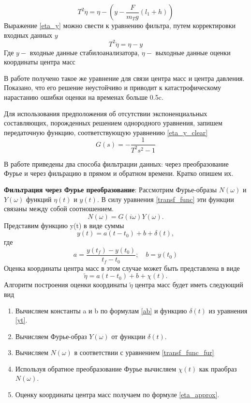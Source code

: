 \documentclass[a4paper,12pt, openany]{book}
\theoremstyle{plain} %
\theoremstyle{definition} %
\theoremstyle{remark} %
\numberwithin{equation}{chapter}
\begin{document}
{\begin{equation}\label{eta_y}
    T^2\ddot{\eta}=\eta-(y-\frac{F}{m_Tg}(l_1+h))
\end{equation}
Выражение \eqref{eta_y} можно свести к уравнению фильтра, путем корректировки входных данных $y$
\begin{equation}\label{eta_y_clear}
    T^2\ddot{\eta}=\eta-y
\end{equation}
Где $y -$  входные данные стабилоанализатора, $\eta -$ выходные данные оценки координаты центра масс

В работе \cite{kruchPodoprihin} получено такое же уравнение для связи центра масс и центра давления. Показано, что его решение неустойчиво и приводит к катастрофическому нарастанию ошибки оценки на временах больше 0.5c.

Для использования предположения об отсутствии экспоненциальных составляющих, порожденных решением однородного уравнения, запишем передаточную функцию, соответствующую
уравнению \eqref{eta_y_clear}
\begin{equation}\label{transf_func}
    G(s)=-\dfrac{1}{T^2s^2-1}
\end{equation}

В работе \cite{kruchPodoprihin} приведены два способа фильтрации данных: через преобразование Фурье и через фильрацию в прямом и обратном времени. Кратко опишем их.

\textbf{Фильтрация через Фурье преобразование}: Рассмотрим Фурье-образы $N(\omega)$ и $Y(\omega)$ функций $\eta(t)$ и $y(t)$. В силу уравнения \eqref{transf_func} эти функции
связаны между собой соотношением.
\begin{equation}\label{transf_func_fur}
    N(\omega) = G(i\omega)Y(\omega).
\end{equation}
Представим функцию y(t) в виде суммы 
\begin{equation}\label{yt}
    y(t) = a(t - t_0) + b + \delta(t),
\end{equation}
где
\begin{equation}\label{ab}
    a=\dfrac{y(t_f)-y(t_0)}{t_f-t_0}; \quad b=y(t_0)
\end{equation}
Оценка координаты центра масс в этом случае
может быть представлена в виде
\begin{equation}\label{eta_approx}
    \tilde{\eta}= a(t-t_0)+b+\chi(t).
\end{equation}
Алгоритм построения оценки координаты $\tilde{\eta}$
центра масс будет иметь следующий вид
\begin{enumerate}
    \item Вычисляем константы a и b по формулам \eqref{ab}
    и функцию $\delta(t)$ из уравнения \eqref{yt}.
    \item Вычисляем Фурье-образ $Y(\omega)$ от функции
    $\delta(t)$.
    \item Вычисляем $N(\omega)$ в соответствии с уравнением \eqref{transf_func_fur}
    \item Используя обратное преобразование Фурье
    вычисляем $\chi(t)$ как праобраз $N(\omega)$.
    \item Оценку координаты центра масс получаем
    по формуле \eqref{eta_approx}.
\end{enumerate}

}
\end{document}
